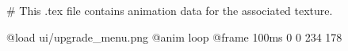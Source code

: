 # This .tex file contains animation data for the associated texture.

@load ui/upgrade_menu.png
@anim loop
	@frame 100ms 0 0 234 178
